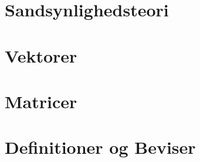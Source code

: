 




\chapter{Sandsynlighedsteori}


\chapter{Vektorer}


\chapter{Matricer}


\chapter{Definitioner og Beviser}





